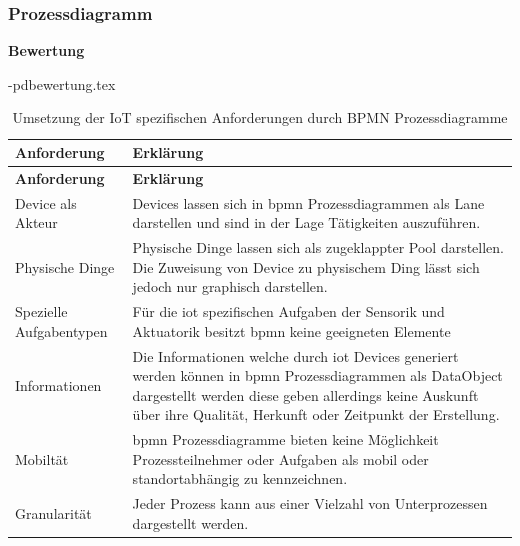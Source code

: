 \documentclass[a4paper, 12pt, twoside, headsepline=true]{scrartcl} %
\begin{document}
\subsubsection{Prozessdiagramm}
\textbf{Bewertung}
\\

\begin{filecontents}{\jobname-pdbewertung.tex}
	\begin{longtable}{P{4cm}|X}
		\caption{Umsetzung der IoT spezifischen Anforderungen durch BPMN Prozessdiagramme}\\
		\label{table:evaluierungskriterien}
		\textbf{Anforderung} & \textbf{Erklärung}   \\ \hline
		\endfirsthead %
		\textbf{Anforderung} & \textbf{Erklärung}  \\ \hline
		\endhead %
		Device als Akteur & Devices lassen sich in \ac{bpmn} Prozessdiagrammen als Lane darstellen und sind in der Lage Tätigkeiten auszuführen.\\ \hline
		Physische Dinge  & Physische Dinge lassen sich als zugeklappter Pool darstellen. Die Zuweisung von Device zu physischem Ding lässt sich jedoch nur graphisch darstellen.\\ \hline
		Spezielle Aufgabentypen & Für die \ac{iot} spezifischen Aufgaben der Sensorik und Aktuatorik besitzt \ac{bpmn} keine geeigneten Elemente\\ \hline
		Informationen  & Die Informationen welche durch \ac{iot} Devices generiert werden können in \ac{bpmn} Prozessdiagrammen als DataObject dargestellt werden diese geben allerdings keine Auskunft über ihre Qualität, Herkunft oder Zeitpunkt der Erstellung. \\ \hline
		Mobiltät & \ac{bpmn} Prozessdiagramme bieten keine Möglichkeit Prozessteilnehmer oder Aufgaben als mobil oder standortabhängig zu kennzeichnen.\\ \hline
		Granularität & Jeder Prozess kann aus einer Vielzahl von Unterprozessen dargestellt werden.\\
	\end{longtable}
\end{filecontents}
\end{document}
